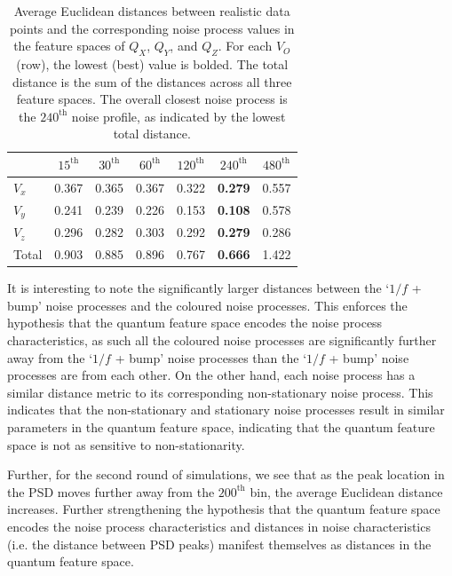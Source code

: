 \documentclass[12pt]{iopart}
\begin{document}
\begin{table}[ht]
    \centering
    \begin{tabular}{lcccccc}
        \toprule
              & $15^\mathrm{th}$ & $30^\mathrm{th}$ & $60^\mathrm{th}$ & $120^\mathrm{th}$ & $240^\mathrm{th}$ & $480^\mathrm{th}$ \\
        \midrule
        $V_x$ & 0.367            & 0.365            & 0.367            & 0.322             & \textbf{0.279}    & 0.557             \\
        $V_y$ & 0.241            & 0.239            & 0.226            & 0.153             & \textbf{0.108}    & 0.578             \\
        $V_z$ & 0.296            & 0.282            & 0.303            & 0.292             & \textbf{0.279}    & 0.286             \\
        \midrule
        Total & 0.903            & 0.885            & 0.896            & 0.767             & \textbf{0.666}    & 1.422             \\
        \bottomrule
    \end{tabular}
    \caption{Average Euclidean distances between realistic data points and the corresponding noise process values in the feature spaces of \(Q_X\), \(Q_Y\), and \(Q_Z\). For each \(V_O\) (row), the lowest (best) value is bolded. The total distance is the sum of the distances across all three feature spaces. The overall closest noise process is the $240^\mathrm{th}$ noise profile, as indicated by the lowest total distance.}
    \label{tab:noise_profiles_new}
\end{table}

It is interesting to note the significantly larger distances between the `$1/f$ + bump' noise processes and the coloured noise processes. This enforces the hypothesis that the quantum feature space encodes the noise process characteristics, as such all the coloured noise processes are significantly further away from the `$1/f$ + bump' noise processes than the `$1/f$ + bump' noise processes are from each other. On the other hand, each noise process has a similar distance metric to its corresponding non-stationary noise process. This indicates that the non-stationary and stationary noise processes result in similar parameters in the quantum feature space, indicating that the quantum feature space is not as sensitive to non-stationarity.

Further, for the second round of simulations, we see that as the peak location in the PSD moves further away from the $200^\mathrm{th}$ bin, the average Euclidean distance increases. Further strengthening the hypothesis that the quantum feature space encodes the noise process characteristics and distances in noise characteristics (i.e. the distance between PSD peaks) manifest themselves as distances in the quantum feature space.
\end{document}
